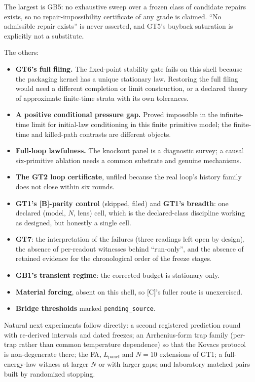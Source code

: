 The largest is GB5: no exhaustive sweep over a frozen class of candidate repairs exists, so no
repair-impossibility certificate of any grade is claimed. ``No admissible repair exists'' is never
asserted, and GT5's buyback saturation is explicitly not a substitute.

The others:
\begin{itemize}
  \item \textbf{GT6's full filing.} The fixed-point stability gate fails on this shell because the
    packaging kernel has a unique stationary law. Restoring the full filing would need a
    different completion or limit construction, or a declared theory of approximate finite-time
    strata with its own tolerances.
  \item \textbf{A positive conditional pressure gap.} Proved impossible in the infinite-time limit
    for initial-law conditioning in this finite primitive model; the finite-time and killed-path
    contrasts are different objects.
  \item \textbf{Full-loop lawfulness.} The knockout panel is a diagnostic survey; a causal
    six-primitive ablation needs a common substrate and genuine mechanisms.
  \item \textbf{The GT2 loop certificate}, unfiled because the real loop's history family does not
    close within six rounds.
  \item \textbf{GT1's [B]-parity control} (skipped, filed) and \textbf{GT1's breadth}: one declared
    (model, $N$, lens) cell, which is the declared-class discipline working as designed, but
    honestly a single cell.
  \item \textbf{GT7}: the interpretation of the failures (three readings left open by design), the
    absence of per-readout witnesses behind ``run-only'', and the absence of retained evidence for
    the chronological order of the freeze stages.
  \item \textbf{GB1's transient regime}: the corrected budget is stationary only.
  \item \textbf{Material forcing}, absent on this shell, so [C]'s fuller route is unexercised.
  \item \textbf{Bridge thresholds} marked \texttt{pending\_source}.
\end{itemize}

Natural next experiments follow directly: a second registered prediction round with re-derived
intervals and dated freezes; an Arrhenius-form trap family (per-trap rather than common
temperature dependence) so that the Kovacs protocol is non-degenerate there; the FA,
$L_{\mathrm{panel}}$ and $N{=}10$ extensions of GT1; a full-energy-law witness at larger $N$ or with
larger gaps; and laboratory matched pairs built by randomized stopping.

